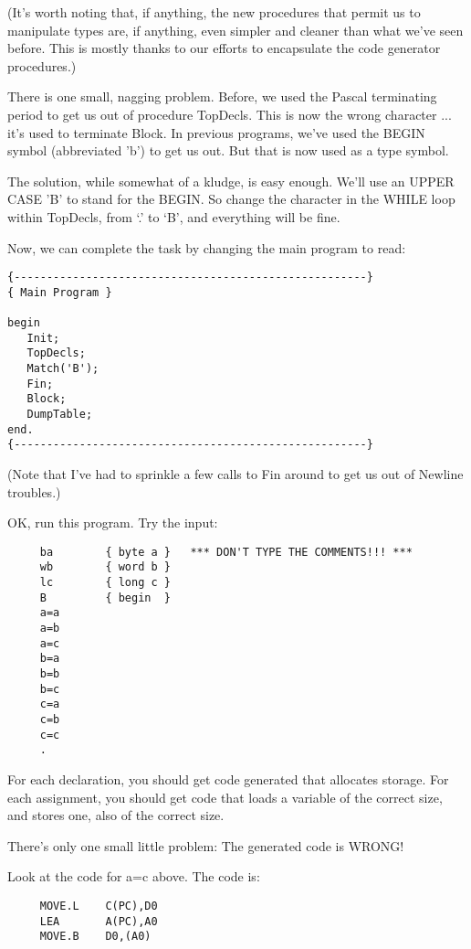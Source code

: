 (It's worth noting that, if  anything, the  new  procedures that permit us to manipulate types  are, if anything, even simpler and cleaner than what we've seen before. This is  mostly  thanks  to our efforts to encapsulate the code generator procedures.)

There is one small, nagging problem. Before, we used  the Pascal terminating period to get us out of procedure TopDecls. This is now the wrong  character  ... it's  used to terminate Block. In previous programs, we've used the BEGIN symbol  (abbreviated 'b') to get us out. But that is now used as a type symbol.

The solution, while somewhat of a kludge, is easy enough. We'll use  an  UPPER CASE 'B' to stand for the BEGIN. So  change  the character in the WHILE loop within TopDecls, from `.' to `B', and everything will be fine.

Now, we can  complete  the  task  by changing the main program to read:

\begin{verbatim}
{------------------------------------------------------}
{ Main Program }

begin
   Init;
   TopDecls;
   Match('B');
   Fin;
   Block;
   DumpTable;
end.
{------------------------------------------------------}
\end{verbatim}

(Note  that I've had to sprinkle a few calls to Fin around to get us out of Newline troubles.)

OK, run this program. Try the input:

\begin{verbatim}
     ba        { byte a }   *** DON'T TYPE THE COMMENTS!!! ***
     wb        { word b }
     lc        { long c }
     B         { begin  }
     a=a
     a=b
     a=c
     b=a
     b=b
     b=c
     c=a
     c=b
     c=c
     .
\end{verbatim}

For  each  declaration, you  should  get  code   generated  that allocates storage. For each assignment, you should get code that loads a variable of the correct size, and stores one, also of the correct size.

There's only one small  little  problem:    The generated code is WRONG!

Look at the code for a=c above. The code is:

\begin{verbatim}
     MOVE.L    C(PC),D0
     LEA       A(PC),A0
     MOVE.B    D0,(A0)
\end{verbatim}

